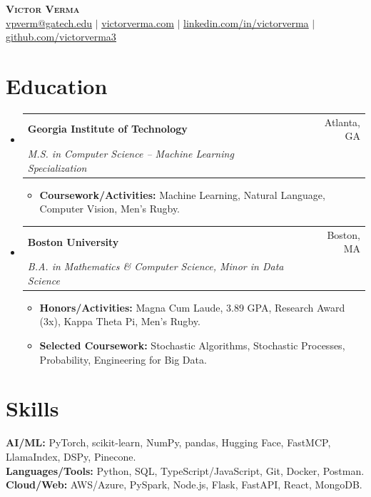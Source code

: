 \documentclass[letterpaper,11pt]{article}
\makeatletter
\newcommand{\resumeItem}[1]{
  \item\small{
    {#1 \vspace{-2pt}}
  }
}
\newcommand{\resumeSubheading}[4]{
  \vspace{-2pt}\item
    \begin{tabular*}{0.97\textwidth}[t]{l@{\extracolsep{\fill}}r}
      \textbf{#1} & #2 \\
      \textit{\small#3} & \textit{\small #4} \\
    \end{tabular*}\vspace{-7pt}
}
\newcommand{\resumeSubHeadingListStart}{\begin{itemize}[leftmargin=0.15in, label={}]}
\newcommand{\resumeSubHeadingListEnd}{\end{itemize}}
\newcommand{\resumeItemListStart}{\begin{itemize}}
\newcommand{\resumeItemListEnd}{\end{itemize}\vspace{-5pt}}
\makeatother
\begin{document}
\begin{center}
    \textbf{\Large \scshape Victor Verma} \\ \vspace{1pt}
    \href{mailto:vpverm@gatech.edu}{\underline{vpverm@gatech.edu}} $|$ 
    \href{https://www.victorverma.com}{\underline{victorverma.com}} $|$ 
    \href{https://linkedin.com/in/victorverma/}{\underline{linkedin.com/in/victorverma}} $|$
    \href{https://github.com/victorverma3}{\underline{github.com/victorverma3}}
\end{center}


\section{Education}
  \resumeSubHeadingListStart
    \resumeSubheading
      {Georgia Institute of Technology}{Atlanta, GA}
      {M.S. in Computer Science \--- Machine Learning Specialization}{}
      \resumeItemListStart
        \resumeItem{\textbf{Coursework/Activities:} Machine Learning, Natural Language, Computer Vision, Men's Rugby.}
      \resumeItemListEnd

    \resumeSubheading
      {Boston University}{Boston, MA}
      {B.A. in Mathematics \& Computer Science, Minor in Data Science}{}
      \resumeItemListStart
        \resumeItem{\textbf{Honors/Activities:} Magna Cum Laude, 3.89 GPA, Research Award (3x), Kappa Theta Pi, Men’s Rugby.}
        \resumeItem{\textbf{Selected Coursework:} Stochastic Algorithms, Stochastic Processes, Probability, Engineering for Big Data.}
      \resumeItemListEnd
  \resumeSubHeadingListEnd
  
\section{Skills}
 \begin{itemize}[leftmargin=0.15in, label={}]
    \small{\item{
     \textbf{AI/ML:}{ PyTorch, scikit-learn, NumPy, pandas, Hugging Face, FastMCP, LlamaIndex, DSPy, Pinecone.} \\
     \textbf{Languages/Tools:}{ Python, SQL, TypeScript/JavaScript, Git, Docker, Postman.} \\
     \textbf{Cloud/Web:}{ AWS/Azure, PySpark, Node.js, Flask, FastAPI, React, MongoDB.}
    }}
 \end{itemize}

\end{document}
